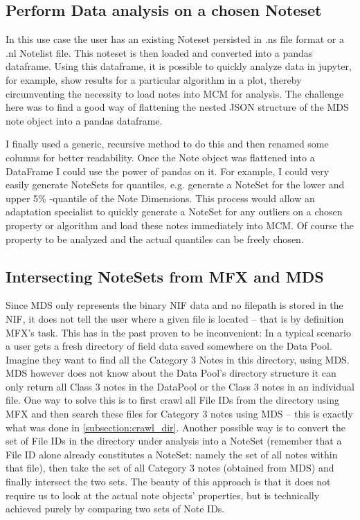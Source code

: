 \subsection{Perform Data analysis on a chosen Noteset}
In this use case the user has an existing Noteset persisted in .ns file format or a .nl Notelist file. This noteset is then loaded and converted into a pandas dataframe. Using this dataframe, it is possible to quickly analyze data in jupyter, for example, show results for a particular algorithm in a plot, thereby circumventing the necessity to load notes into MCM for analysis. The challenge here was to find a good way of flattening the nested JSON structure of the MDS note object into a pandas dataframe. \par I finally used a generic, recursive method to do this and then renamed some columns for better readability. Once the Note object was flattened into a DataFrame I could use the power of pandas on it. For example, I could very easily generate NoteSets for quantiles, e.g. generate a NoteSet for the lower and upper 5\% -quantile of the Note Dimensions. This process would allow an adaptation specialist to quickly generate a NoteSet for any outliers on a chosen property or algorithm and load these notes immediately into MCM. Of course the property to be analyzed and the actual quantiles can be freely chosen.
\subsection{Intersecting NoteSets from MFX and MDS}
Since MDS only represents the binary NIF data and no filepath is stored in the NIF, it does not tell the user where a given file is located -- that is by definition MFX's task. This has in the past proven to be inconvenient: In a typical scenario a user gets a fresh directory of field data saved somewhere on the Data Pool. Imagine they want to find all the Category 3 Notes in this directory, using MDS. MDS however does not know about the Data Pool's directory structure it can only return all Class 3 notes in the DataPool or the Class 3 notes in an individual file. One way to solve this is to first crawl all File IDs from the directory using MFX and then search these files for Category 3 notes using MDS -- this is exactly what was done in \ref{subsection:crawl_dir}. Another possible way is to convert the set of File IDs in the directory under analysis into a NoteSet (remember that a File ID alone already constitutes a NoteSet: namely the set of all notes within that file), then take the set of all Category 3 notes (obtained from MDS) and finally intersect the two sets. The beauty of this approach is that it does not require us to look at the actual note objects' properties, but is technically achieved purely by comparing two sets of Note IDs. 
